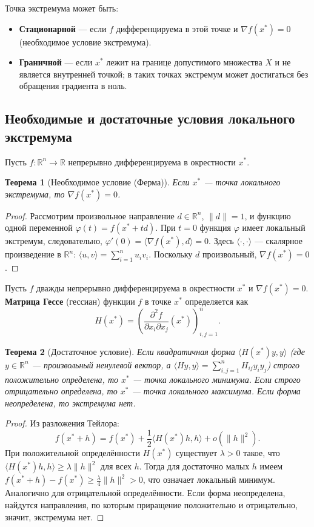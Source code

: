\documentclass{article}
\theoremstyle{plain}
\newtheorem{theorem}{Теорема}[section]
\begin{document}
Точка экстремума может быть:
\begin{itemize}
  \item \textbf{Стационарной} — если $f$ дифференцируема в этой точке и $\nabla f(x^*) = 0$ (необходимое условие экстремума).
  \item \textbf{Граничной} — если $x^*$ лежит на границе допустимого множества $X$ и не является внутренней точкой; в таких точках экстремум может достигаться без обращения градиента в ноль.
\end{itemize}

\subsection{Необходимые и достаточные условия локального экстремума}
Пусть $f: \mathbb{R}^n \to \mathbb{R}$ непрерывно дифференцируема в окрестности $x^*$.

\begin{theorem}[Необходимое условие (Ферма)]
Если $x^*$ — точка локального экстремума, то $\nabla f(x^*) = 0$.
\end{theorem}
\begin{proof}
Рассмотрим произвольное направление $d \in \mathbb{R}^n$, $\|d\|=1$, и функцию одной переменной $\varphi(t) = f(x^* + t d)$. При $t=0$ функция $\varphi$ имеет локальный экстремум, следовательно, $\varphi'(0) = \langle \nabla f(x^*), d \rangle = 0$. Здесь $\langle \cdot, \cdot \rangle$ — скалярное произведение в $\mathbb{R}^n$: $\langle u,v \rangle = \sum_{i=1}^n u_i v_i$. Поскольку $d$ произвольный, $\nabla f(x^*) = 0$.
\end{proof}

Пусть $f$ дважды непрерывно дифференцируема в окрестности $x^*$ и $\nabla f(x^*) = 0$. \textbf{Матрица Гессе} (гессиан) функции $f$ в точке $x^*$ определяется как
\[
H(x^*) = \left( \frac{\partial^2 f}{\partial x_i \partial x_j}(x^*) \right)_{i,j=1}^n.
\]

\begin{theorem}[Достаточное условие]
Если квадратичная форма $\langle H(x^*)y, y \rangle$ (где $y \in \mathbb{R}^n$ — произвольный ненулевой вектор, а $\langle H y, y \rangle = \sum_{i,j=1}^n H_{ij} y_i y_j$) строго положительно определена, то $x^*$ — точка локального минимума. Если строго отрицательно определена, то $x^*$ — точка локального максимума. Если форма неопределена, то экстремума нет.
\end{theorem}
\begin{proof}
Из разложения Тейлора:
\[
f(x^*+h) = f(x^*) + \frac{1}{2}\langle H(x^*)h, h\rangle + o(\|h\|^2).
\]
При положительной определённости $H(x^*)$ существует $\lambda > 0$ такое, что $\langle H(x^*)h, h\rangle \ge \lambda \|h\|^2$ для всех $h$. Тогда для достаточно малых $h$ имеем $f(x^*+h) - f(x^*) \ge \frac{\lambda}{4}\|h\|^2 > 0$, что означает локальный минимум. Аналогично для отрицательной определённости. Если форма неопределена, найдутся направления, по которым приращение положительно и отрицательно, значит, экстремума нет.
\end{proof}
\end{document}
